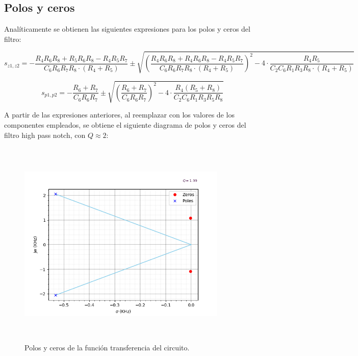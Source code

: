 \subsection{Polos y ceros}

Anal\'iticamente se obtienen las siguientes expresiones para los polos y ceros del filtro:

\begin{equation}
s_{z1,z2} = - \frac{R_4  R_6  R_8+R_5  R_6  R_8 - R_4 R_5 R_7}{C_6 R_6 R_7 R_8 \cdot (R_4 + R_5)} \pm \sqrt{\left( \frac{R_4 R_6 R_8 + R_4 R_6 R_8 - R_4 R_5 R_7}{C_6 R_6 R_7 R_8 \cdot (R_4 + R_5)}\right)^2- 4 \cdot \frac{R_4 R_5}{C_2 C_6 R_1 R_3 R_8 \cdot (R_4 + R_5)}}
\label{ceros}
\end{equation}

\begin{equation}
s_{p1,p2} = - \frac{R_6 + R_7}{C_6 R_6 R_7} \pm \sqrt{\left( \frac{R_6 + R_7}{C_6 R_6 R_7}\right)^2 - 4 \cdot \frac{R_4(R_5+R_8)}{C_2 C_6 R_1 R_3 R_5 R_8}}
\label{polos}
\end{equation}


A partir de las expresiones anteriores, al reemplazar con los valores de los componentes empleados, se obtiene el siguiente diagrama de polos y ceros del filtro high pass notch, con $Q\approx 2$:

\begin{figure}[H] %
	\centering
	\includegraphics[width=10cm,height=10cm,keepaspectratio]{../EJ1/00GRAFICOS/singularidades.png}
	\caption{Polos y ceros de la funci\'on transferencia del circuito.}
	\label{c1vinmax}
\end{figure}

